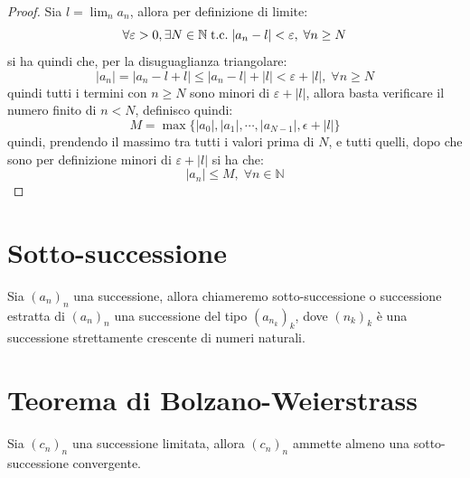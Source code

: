 \documentclass[a4paper,12pt,openright]{book}
\begin{document}
	\begin{proof}
		Sia $l = \lim_{n} a_n$, allora per definizione di limite:
		\[\forall \varepsilon > 0, \exists N \in \mathbb{N} \;\text{t.c.}\; |a_n - l| < \varepsilon, \; \forall n \geq N\]
		si ha quindi che, per la disuguaglianza triangolare:
		\[|a_n| = |a_n - l + l| \leq |a_n - l| + |l| < \varepsilon + |l|, \; \forall n \geq N\]
		quindi tutti i termini con $n \geq N$ sono minori di $\varepsilon + |l|$, allora basta verificare il numero finito di $n < N$, definisco quindi:
		\[M = \max\{|a_0|, |a_1|, \cdots, |a_{N - 1}|, \epsilon + |l|\}\]
		quindi, prendendo il massimo tra tutti i valori prima di $N$, e tutti quelli, dopo che sono per definizione minori di $\varepsilon + |l|$ si ha che:
		\[|a_n| \leq M, \; \forall n \in \mathbb{N}\]
	\end{proof}
		
	\section{Sotto-successione}
	Sia $(a_n)_n$ una successione, allora chiameremo sotto-successione o successione estratta di $(a_n)_n$ una successione del tipo $(a_{n_k})_k$, dove $(n_k)_k$ è una successione strettamente crescente di numeri naturali.
	
	\newpage
	
	\section{Teorema di Bolzano-Weierstrass}
	Sia $(c_n)_n$ una successione limitata, allora $(c_n)_n$ ammette almeno una sotto-successione convergente.
	
\end{document}
